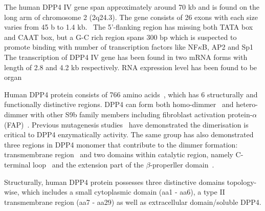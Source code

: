The human DPP4 IV gene span approximately around 70 kb and is found on the long arm of chromosome 2 (2q24.3). The gene consists of 26 exons with each size varies from 45 b to 1.4 kb.~\cite{Abbott1994} The 5'-flanking region has missing both TATA box and CAAT box, but a G-C rich region spans 300 bp which is suspected to promote binding with number of transcription factors like NF$\kappa$B, AP2 and Sp1~\cite{Abbott1994,Böhm1995} The transcription of DPP4 IV gene has been found in two mRNA forms with length of 2.8 and 4.2 kb respectively. RNA expression level has been found to be organ 
\par
Human DPP4 protein consists of 766 amino acids~\cite{Bär2003,Misumi1992}, which has 6 structurally and functionally distinctive regions. DPP4 can form both homo-dimmer~\cite{Rasmussen2003,Oefner2003,Thoma2003} and hetero-dimmer with other S9b family members including fibroblast activation protein-$\alpha$ (FAP)~\cite{Ghersi2006}. Previous mutagenesis studies~\cite{Chien_2004,Chien_2006} have demonstrated the dimerisation is critical to DPP4 enzymatically activity. The same group has also demonstrated three regions in DPP4 monomer that contribute to the dimmer formation: transmembrane region~\cite{Chung_2010} and two domains within catalytic region, namely C-terminal loop~\cite{Chien_2004} and the extension part of the $\beta$-properller domain~\cite{Chien_2006}.  
\par 
Structurally, human DPP4 protein possesses three distinctive domains topology-wise, which includes a small cytoplasmic domain (aa1 - aa6), a type II transmembrane region (aa7 - aa29) as well as extracellular domain/soluble DPP4. 
\par